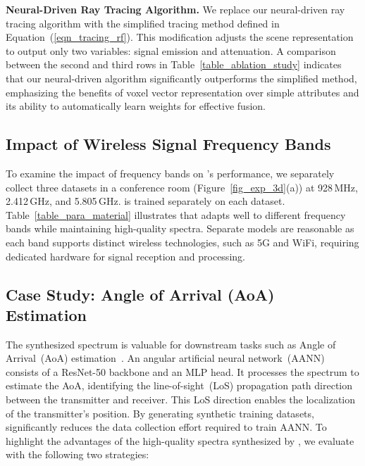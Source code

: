 \textbf{Neural-Driven Ray Tracing Algorithm.}  
We replace our neural-driven ray tracing algorithm with the simplified tracing method defined in Equation~(\ref{eqn_tracing_rf}). 
This modification adjusts the scene representation to output only two variables: signal emission and attenuation. 
A comparison between the second and third rows in Table~\ref{table_ablation_study} indicates that our neural-driven algorithm significantly outperforms the simplified method, emphasizing the benefits of voxel vector representation over simple attributes and its ability to automatically learn weights for effective fusion.



\subsection{Impact of Wireless Signal Frequency Bands}\label{sec_parameter_study}

To examine the impact of frequency bands on \ourSystem's performance, we separately collect three datasets in a conference room (Figure~\ref{fig_exp_3d}(a)) at 928\,MHz, 2.412\,GHz, and 5.805\,GHz.
\ourSystem is trained separately on each dataset. 
Table~\ref{table_para_material} illustrates that \ourSystem adapts well to different frequency bands while maintaining high-quality spectra. 
Separate models are reasonable as each band supports distinct wireless technologies, such as 5G and WiFi, requiring dedicated hardware for signal reception and processing. 



\subsection{Case Study: Angle of Arrival (AoA) Estimation}\label{sec_eval_case_study} 
The synthesized spectrum is valuable for downstream tasks such as Angle of Arrival~(AoA) estimation~\cite{an2020general}. 
An angular artificial neural network~(AANN) consists of a ResNet-50 backbone and an MLP head. 
It processes the spectrum to estimate the AoA, identifying the line-of-sight~(LoS) propagation path direction between the transmitter and receiver. 
This LoS direction enables the localization of the transmitter's position.
By generating synthetic training datasets, \ourSystem significantly reduces the data collection effort required to train AANN.  
To highlight the advantages of the high-quality spectra synthesized by \ourSystem, we evaluate with the following two strategies:

